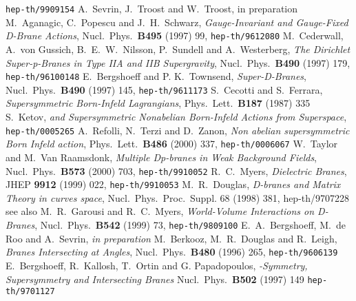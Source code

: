\documentclass[12pt,a4paper]{article}
\begin{document}
\begin{thebibliography}{99}
               {\tt hep-th/9909154}
  A.~Sevrin, J.~Troost and W.~Troost,  in preparation
  M.~Aganagic, C.~Popescu and J.~H.~Schwarz,
               {\it Gauge-Invariant and Gauge-Fixed D-Brane Actions},
               Nucl.~Phys.~{\bf B495} (1997) 99,
               {\tt hep-th/9612080}
  M.~Cederwall, A.~von Gussich, B.~E.~W.~Nilsson,
                P.~Sundell and A.~Westerberg,
               {\it The Dirichlet Super-p-Branes in Type IIA and IIB
                   Supergravity},
               Nucl.~Phys.~{\bf B490} (1997) 179,
               {\tt hep-th/96100148}
   E.~Bergshoeff and P. K.~Townsend,
               {\it Super-D-Branes},
               Nucl.~Phys.~{\bf B490} (1997) 145,
               {\tt hep-th/9611173}
   S.~Cecotti and S.~Ferrara,
               {\it Supersymmetric Born-Infeld Lagrangians},
               Phys.~Lett.~{\bf B187} (1987) 335
   S.~Ketov,
               {\it {}\coordHE{} and \coordHE{} Supersymmetric Nonabelian
                   Born-Infeld Actions from Superspace},
               {\tt hep-th/0005265}
  A.~Refolli, N.~Terzi and D.~Zanon,
               {\it Non abelian \coordHE{} supersymmetric Born Infeld
                   action},
               Phys.~Lett.~{\bf B486} (2000) 337,
               {\tt hep-th/0006067}
   W.~Taylor and M.~Van Raamsdonk,
               {\it Multiple Dp-branes in Weak Background Fields},
               Nucl.~Phys.~{\bf B573} (2000) 703,
               {\tt hep-th/9910052}
    R.~C.~Myers,
               {\it Dielectric Branes},
               JHEP {\bf 9912} (1999) 022,\hfill\break
               {\tt hep-th/9910053}
    M.~R.~Douglas,
               {\it D-branes and Matrix Theory in curves space},
               Nucl.~Phys.~Proc.~Suppl. 68 (1998) 381,
               {hep-th/9707228}
               see also
               M.~R.~Garousi and R.~C.~Myers,
               {\it World-Volume Interactions on D-Branes},
               Nucl.~Phys.~{\bf B542} (1999) 73,
               {\tt hep-th/9809100}
 E.~A.~Bergshoeff, M.~de Roo and A.~Sevrin,
               {\it in preparation}
  M.~Berkooz, M.~R.~Douglas and R.~Leigh,
               {\it Branes Intersecting at Angles},
               Nucl.~Phys.~{\bf B480} (1996) 265,
               {\tt hep-th/9606139}
 E.~Bergshoeff, R.~Kallosh, T.~Ortin and G. Papadopoulos,
               {\it \myHighlight{$\kappa$}\coordHE{}-Symmetry, Supersymmetry and Intersecting
               Branes}
               Nucl.~Phys.~{\bf B502} (1997) 149
               {\tt hep-th/9701127}



\end{thebibliography}
\end{document}

